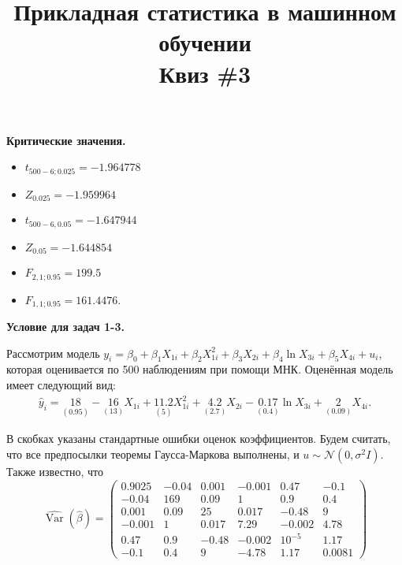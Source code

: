 \documentclass[10pt, a4paper]{extarticle}
\title{{\normalsize Прикладная статистика в машинном обучении} \\ \vspace{0.5em} Квиз \#3}
\author{\rule{15cm}{0.4pt}}
\DeclareMathOperator{\Var}{Var}
\begin{document}
	
	\maketitle
	
	\begin{center}
		{\large \textbf{Критические значения.}}
		\begin{multicols}{3}
			\begin{itemize}
				\item $t_{500-6; 0.025} = -1.964778$
				\item $Z_{0.025} = -1.959964$
				\item $t_{500-6, 0.05} = -1.647944$
				\item $Z_{0.05} = -1.644854$
				\item $F_{2, 1; 0.95} = 199.5$
				\item $F_{1, 1; 0.95} = 161.4476$.
			\end{itemize}
		\end{multicols}	
	\end{center}
	\vspace{1em}
	
	\begin{center}
	{\large \textbf{Условие для задач 1-3.}}
	\end{center}
	
	Рассмотрим модель $y_i = \beta_0 + \beta_1X_{1i} + \beta_2X^2_{1i} + \beta_3X_{2i} + \beta_4\ln X_{3i} + \beta_5X_{4i} + u_i$, которая оценивается по 500 наблюдениям при помощи МНК. Оценённая модель имеет следующий вид:
	\begin{align*}
		\hat{y}_i = \underset{(0.95)}{18} - \underset{(13)}{16}X_{1i} + \underset{(5)}{11.2}X^2_{1i} + \underset{(2.7)}{4.2}X_{2i} - \underset{(0.4)}{0.17}\ln X_{3i} + \underset{(0.09)}{2}X_{4i}.
	\end{align*}
	
	В скобках указаны стандартные ошибки оценок коэффициентов. Будем считать, что все предпосылки теоремы Гаусса-Маркова выполнены, и $u \sim \mathcal{N}(0, \sigma^2I)$. Также известно, что
	\[
	\hat{\Var}(\hat{\beta}) = \begin{pmatrix}
		0.9025 & -0.04 & 0.001 & -0.001  & 0.47 & -0.1 \\
		-0.04  & 169 & 0.09 & 1 & 0.9 & 0.4 \\
		0.001  & 0.09 & 25 & 0.017 & -0.48 & 9 \\
		-0.001 & 1 & 0.017 & 7.29 & -0.002 & 4.78 \\
		0.47 & 0.9 & -0.48 & -0.002 & 10^{-5} & 1.17 \\
		-0.1 & 0.4 & 9 & -4.78 & 1.17 &  0.0081
	\end{pmatrix}
	\]
	\vspace{1em}
	
\end{document}
